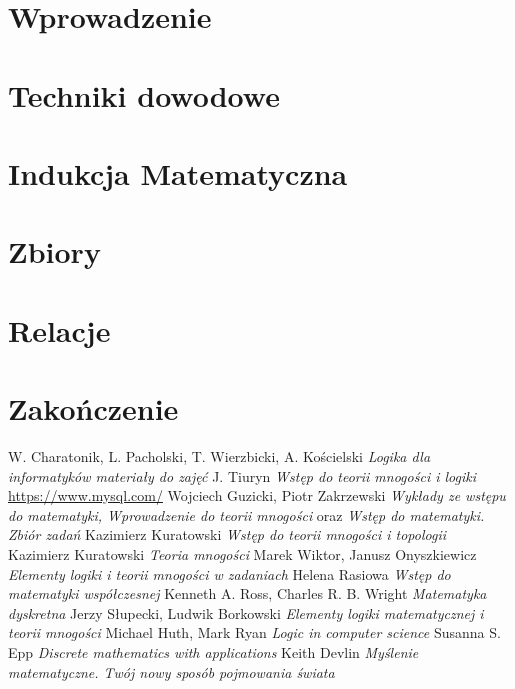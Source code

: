




\chapter{Wprowadzenie}


\chapter{Techniki dowodowe}
\label{chapter:proofs}


\chapter{Indukcja Matematyczna}
\label{chapter:induction}


\chapter{Zbiory}
\label{chapter:sets}


\chapter{Relacje}
\label{chapter:relation}


\chapter{Zakończenie}
\label{chapter:ending}


\begin{thebibliography}{5}

 W. Charatonik, L. Pacholski, T. Wierzbicki, A. Kościelski  \emph{Logika dla informatyków materiały do zajęć} 
 J. Tiuryn  \emph{Wstęp do teorii mnogości i logiki}
 \href{https://www.mysql.com/}{https://www.mysql.com/}
 Wojciech Guzicki, Piotr Zakrzewski \emph{Wykłady ze wstępu do matematyki, Wprowadzenie do teorii mnogości} oraz \emph{Wstęp do matematyki. Zbiór zadań}
 Kazimierz Kuratowski \emph{Wstęp do teorii mnogości i topologii}
 Kazimierz Kuratowski \emph{Teoria mnogości}
 Marek Wiktor, Janusz Onyszkiewicz \emph{Elementy logiki i teorii mnogości w zadaniach}
 Helena Rasiowa \emph{Wstęp do matematyki współczesnej}
 Kenneth A. Ross, Charles R. B. Wright \emph{Matematyka dyskretna}
 Jerzy Słupecki, Ludwik Borkowski \emph{Elementy logiki matematycznej i teorii mnogości}
 Michael Huth, Mark Ryan \emph{Logic in computer science}
 Susanna S. Epp \emph{Discrete mathematics with applications}
 Keith Devlin \emph{Myślenie matematyczne. Twój nowy sposób pojmowania świata}
\end{thebibliography}


 